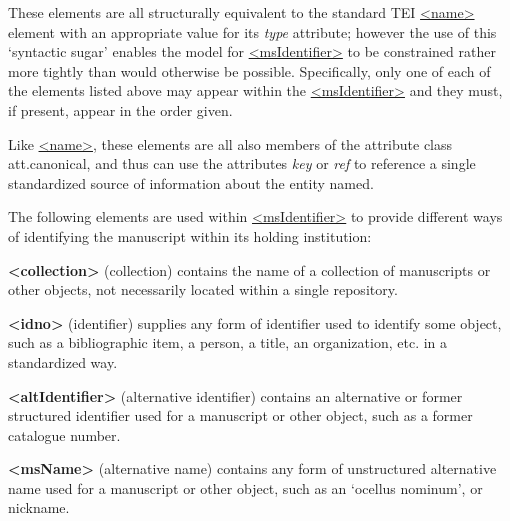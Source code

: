 \par
These elements are all structurally equivalent to the standard TEI \hyperref[TEI.name]{<name>} element with an appropriate value for its {\itshape type} attribute; however the use of this ‘syntactic sugar’ enables the model for \hyperref[TEI.msIdentifier]{<msIdentifier>} to be constrained rather more tightly than would otherwise be possible. Specifically, only one of each of the elements listed above may appear within the \hyperref[TEI.msIdentifier]{<msIdentifier>} and they must, if present, appear in the order given.\par
Like \hyperref[TEI.name]{<name>}, these elements are all also members of the attribute class \textsf{att.canonical}, and thus can use the attributes {\itshape key} or {\itshape ref} to reference a single standardized source of information about the entity named.\par
The following elements are used within \hyperref[TEI.msIdentifier]{<msIdentifier>} to provide different ways of identifying the manuscript within its holding institution: 
\begin{sansreflist}
  
\item [\textbf{<collection>}] (collection) contains the name of a collection of manuscripts or other objects, not necessarily located within a single repository.
\item [\textbf{<idno>}] (identifier) supplies any form of identifier used to identify some object, such as a bibliographic item, a person, a title, an organization, etc. in a standardized way.
\item [\textbf{<altIdentifier>}] (alternative identifier) contains an alternative or former structured identifier used for a manuscript or other object, such as a former catalogue number.
\item [\textbf{<msName>}] (alternative name) contains any form of unstructured alternative name used for a manuscript or other object, such as an ‘ocellus nominum’, or nickname.
\end{sansreflist}
\par
